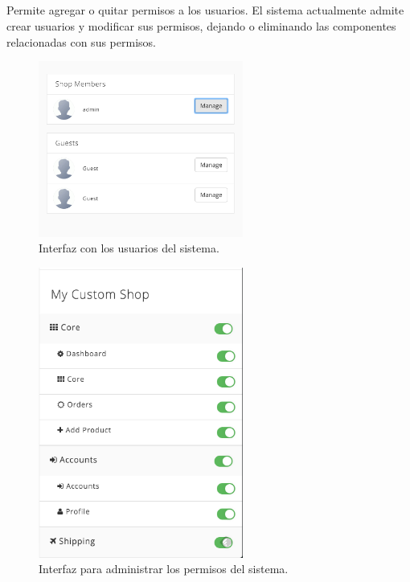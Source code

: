 \subsection{\accountsEF}

	Permite agregar o quitar permisos a los usuarios. El sistema actualmente admite crear usuarios y modificar sus permisos, dejando o eliminando las componentes relacionadas con sus permisos.

	\begin{figure}[H]
		\centering
		\includegraphics[width=0.6\textwidth]{figuras/dashboard/account/users.png}
		\caption{Interfaz con los usuarios del sistema.}
		\label{figure:dashboard:account:users}
	\end{figure}


	\begin{figure}[H]
		\centering
		\includegraphics[width=0.6\textwidth]{figuras/dashboard/account/permisos.png}
		\caption{Interfaz para administrar los permisos del sistema.}
		\label{figure:dashboard:account:permisos}
	\end{figure}

